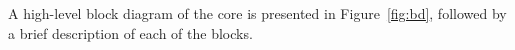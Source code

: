 A high-level block diagram of the core is presented in Figure~\ref{fig:bd},
followed by a brief description of each of the blocks.




\begin{description}
    


\end{description}
